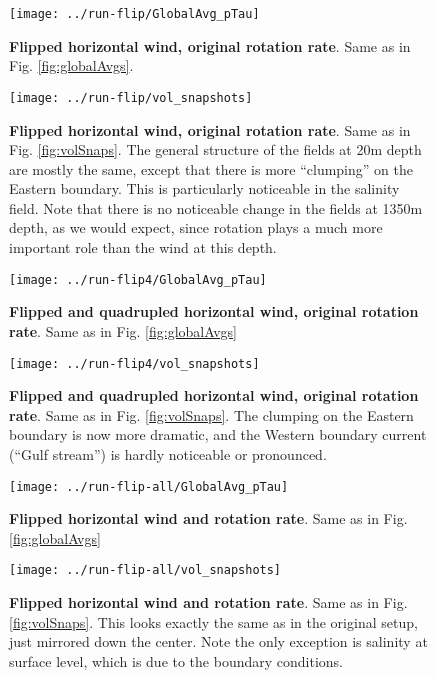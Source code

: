 \documentclass[a4paper,11pt]{article}
\begin{document}

\begin{figure}
\centering
\texttt{[image: ../run-flip/GlobalAvg\_pTau]}
\caption{\textbf{Flipped horizontal wind, original rotation rate}. Same as in Fig. \ref{fig:globalAvgs}. }
\label{fig:flipGlobalAvgs}
\end{figure}

\begin{figure}
\centering
\texttt{[image: ../run-flip/vol\_snapshots]}
\caption{\textbf{Flipped horizontal wind, original rotation rate}. Same as in Fig. \ref{fig:volSnaps}. The general structure of the fields at 20m depth are mostly the same, except that there is more ``clumping'' on the Eastern boundary. This is particularly noticeable in the salinity field. Note that there is no noticeable change in the fields at 1350m depth, as we would expect, since rotation plays a much more important role than the wind at this depth.}
\label{fig:flipVolSnaps}
\end{figure}


\begin{figure}
\centering
\texttt{[image: ../run-flip4/GlobalAvg\_pTau]}
\caption{\textbf{Flipped and quadrupled horizontal wind, original rotation rate}. Same as in Fig. \ref{fig:globalAvgs}}
\label{fig:flipr_GlobalAvgs}
\end{figure}

\begin{figure}
\centering
\texttt{[image: ../run-flip4/vol\_snapshots]}
\caption{\textbf{Flipped and quadrupled horizontal wind, original rotation rate}. Same as in Fig. \ref{fig:volSnaps}. The clumping on the Eastern boundary is now more dramatic, and the Western boundary current (``Gulf stream'') is hardly noticeable or pronounced. }
\label{fig:flip4_olSnaps}
\end{figure}


\begin{figure}
\centering
\texttt{[image: ../run-flip-all/GlobalAvg\_pTau]}
\caption{\textbf{Flipped horizontal wind and rotation rate}. Same as in Fig. \ref{fig:globalAvgs}}
\label{fig:flip_all_GlobalAvgs}
\end{figure}

\begin{figure}
\centering
\texttt{[image: ../run-flip-all/vol\_snapshots]}
\caption{\textbf{Flipped horizontal wind and rotation rate}. Same as in Fig. \ref{fig:volSnaps}. This looks exactly the same as in the original setup, just mirrored down the center. Note the only exception is salinity at surface level, which is due to the boundary conditions. }
\label{fig:flip_all_volSnaps}
\end{figure}
\end{document}
